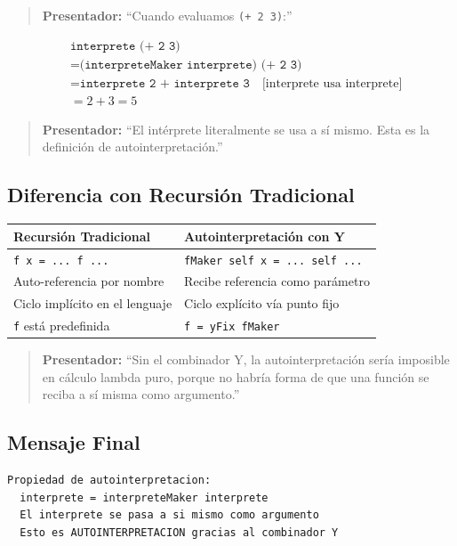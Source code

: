 \documentclass[12pt]{article}
\begin{document}
\begin{quote}
\textbf{Presentador:} ``Cuando evaluamos \texttt{(+ 2 3)}:''
\end{quote}

\begin{align*}
&\texttt{interprete (+ 2 3)} \\
&= \texttt{(interpreteMaker interprete) (+ 2 3)} \\
&= \texttt{interprete 2 + interprete 3} \quad \text{[interprete usa interprete]} \\
&= 2 + 3 = 5
\end{align*}

\begin{quote}
\textbf{Presentador:} ``El intérprete literalmente se usa a sí mismo. Esta es la definición de autointerpretación.''
\end{quote}

\subsection*{Diferencia con Recursión Tradicional}

\begin{center}
\begin{tabular}{|l|l|}
\hline
\textbf{Recursión Tradicional} & \textbf{Autointerpretación con Y} \\
\hline
\texttt{f x = ... f ...} & \texttt{fMaker self x = ... self ...} \\
Auto-referencia por nombre & Recibe referencia como parámetro \\
Ciclo implícito en el lenguaje & Ciclo explícito vía punto fijo \\
\texttt{f} está predefinida & \texttt{f = yFix fMaker} \\
\hline
\end{tabular}
\end{center}

\begin{quote}
\textbf{Presentador:} ``Sin el combinador Y, la autointerpretación sería imposible en cálculo lambda puro, porque no habría forma de que una función se reciba a sí misma como argumento.''
\end{quote}

\subsection*{Mensaje Final}

\begin{verbatim}
Propiedad de autointerpretacion:
  interprete = interpreteMaker interprete
  El interprete se pasa a si mismo como argumento
  Esto es AUTOINTERPRETACION gracias al combinador Y
\end{verbatim}
\end{document}
